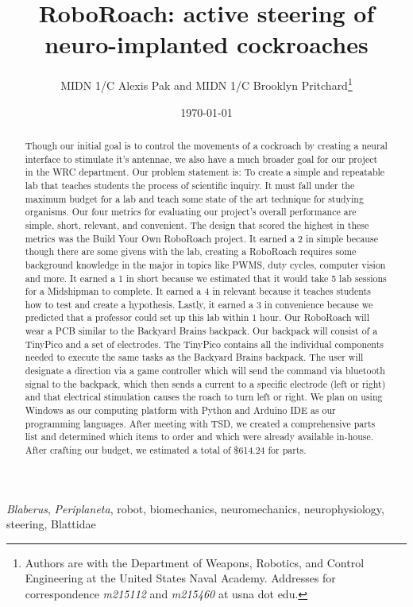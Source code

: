 \documentclass[twocolumn,10pt]{IEEEtran}
\title{RoboRoach: active steering of neuro-implanted cockroaches}
\author{MIDN 1/C Alexis Pak and MIDN 1/C Brooklyn Pritchard\thanks{Authors are with the Department of Weapons, Robotics, and Control Engineering at the United States Naval Academy. Addresses for correspondence \emph{m215112} and \emph{m215460} at usna dot edu.}}
\date{\today}
\newcommand{\Blaberus}{\emph{Blaberus}}
\newcommand{\Periplaneta}{\emph{Periplaneta}}
\begin{document}
\maketitlepage
\maketitle

\begin{abstract}
Though our initial goal is to control the movements of a cockroach by creating a neural interface to stimulate it’s antennae, we also have a much broader goal for our project in the WRC department. Our problem statement is: To create a simple and repeatable lab that teaches students the process of scientific inquiry. It must fall under the maximum budget for a lab and teach some state of the art technique for studying organisms. Our four metrics for evaluating our project’s overall performance are simple, short, relevant, and convenient. The design that scored the highest in these metrics was the Build Your Own RoboRoach project. It earned a 2 in simple because though there are some givens with the lab, creating a RoboRoach requires some background knowledge in the major in topics like PWMS, duty cycles, computer vision and more. It earned a 1 in short because we estimated that it would take 5 lab sessions for a Midshipman to complete. It earned a 4 in relevant because it teaches students how to test and create a hypothesis. Lastly, it earned a 3 in convenience because we predicted that a professor could set up this lab within 1 hour.  Our RoboRoach will wear a PCB similar to the Backyard Brains backpack. Our backpack will consist of a TinyPico and a set of electrodes. The TinyPico contains all the individual components needed to execute the same tasks as the Backyard Brains backpack. The user will designate a direction via a game controller which will send the command via bluetooth signal to the backpack, which then sends a current to a specific electrode (left or right) and that electrical stimulation causes the roach to turn left or right. We plan on using Windows as our computing platform with Python and Arduino IDE as our programming languages. After meeting with TSD, we created a comprehensive parts list and determined which items to order and which were already available in-house. After crafting our budget, we estimated a total of
\$614.24 for parts. 
\end{abstract}

\begin{IEEEkeywords}
\Blaberus, \Periplaneta, robot, biomechanics, neuromechanics, neurophysiology, steering, Blattidae
\end{IEEEkeywords}
\end{document}
